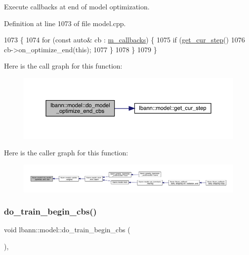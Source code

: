 Execute callbacks at end of model optimization. 

Definition at line 1073 of file model.\+cpp.


\begin{DoxyCode}
1073                                       \{
1074   \textcolor{keywordflow}{for} (\textcolor{keyword}{const} \textcolor{keyword}{auto}& cb : \hyperlink{classlbann_1_1model_a07b511fef30368494c2ad80922ffd0eb}{m\_callbacks}) \{
1075     \textcolor{keywordflow}{if} (\hyperlink{classlbann_1_1model_ad0cdcba177434b52dc9c4a97be183a92}{get\_cur\_step}() %
1076       cb->on\_optimize\_end(\textcolor{keyword}{this});
1077     \}
1078   \}
1079 \}
\end{DoxyCode}
Here is the call graph for this function\+:\nopagebreak
\begin{figure}[H]
\begin{center}
\leavevmode
\includegraphics[width=350pt]{classlbann_1_1model_ac0b37e4f4881e274bd9c4889d4852fe8_cgraph}
\end{center}
\end{figure}
Here is the caller graph for this function\+:\nopagebreak
\begin{figure}[H]
\begin{center}
\leavevmode
\includegraphics[width=350pt]{classlbann_1_1model_ac0b37e4f4881e274bd9c4889d4852fe8_icgraph}
\end{center}
\end{figure}
\mbox{\label{classlbann_1_1model_a780395fa740102adda5537aa5d257698}} 
\subsubsection{\texorpdfstring{do\+\_\+train\+\_\+begin\+\_\+cbs()}{do\_train\_begin\_cbs()}}
{\footnotesize\ttfamily void lbann\+::model\+::do\+\_\+train\+\_\+begin\+\_\+cbs (\begin{DoxyParamCaption}{ }\end{DoxyParamCaption})\hspace{0.3cm}{\ttfamily [protected]}, {\ttfamily [virtual]}}

